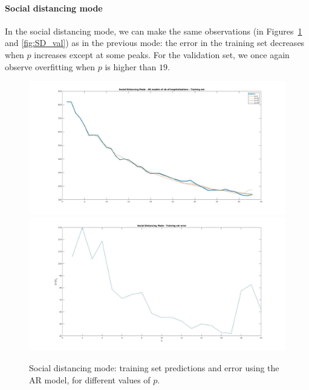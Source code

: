 \documentclass[11pt]{article}
\begin{document}
\paragraph{Social distancing mode}
In the social distancing mode, we can make the same observations (in Figures~\ref{fig:SD_train} and \ref{fig:SD_val}) as in the previous mode: the error in the training set decreases when \(p\) increases except at some peaks.
For the validation set, we once again observe overfitting when \(p\) is higher than \(19\).
\begin{figure}[h!]
	\centering
	\includegraphics[scale=0.3]{SD_train.jpg}
	\includegraphics[scale=0.3]{SD_Err_Train.jpg}
	\caption{Social distancing mode: training set predictions and error using the AR model, for different values of \(p\).}
	\label{fig:SD_train}
\end{figure}
\end{document}
